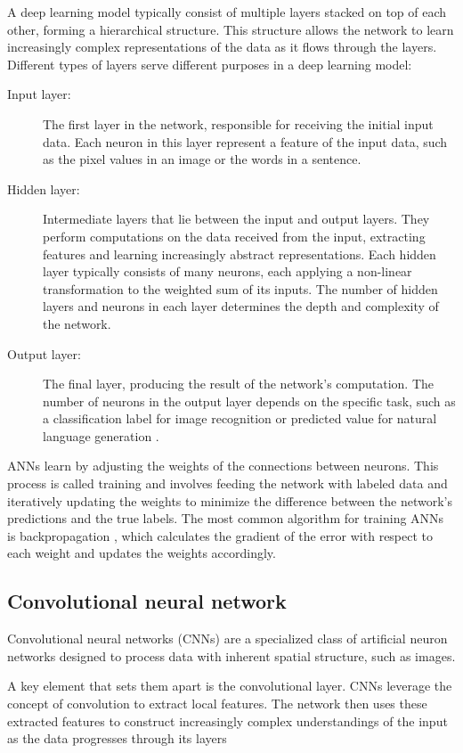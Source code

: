 A deep learning model typically consist of multiple layers stacked on top of each other, forming a hierarchical structure.
This structure allows the network to learn increasingly complex representations of the data as it flows through the layers.
Different types of layers serve different purposes in a deep learning model:
\begin{description}
    \item[Input layer:] 
    The first layer in the network, responsible for receiving the initial input data.
    Each neuron in this layer represent a feature of the input data, such as the pixel values in an image or the words in a sentence.
    \item[Hidden layer:] 
    Intermediate layers that lie between the input and output layers.
    They perform computations on the data received from the input, extracting features and learning increasingly abstract representations.
    Each hidden layer typically consists of many neurons, each applying a non-linear transformation to the weighted sum of its inputs. %
    The number of hidden layers and neurons in each layer determines the depth and complexity of the network.
    \item[Output layer:] 
    The final layer, producing the result of the network's computation.
    The number of neurons in the output layer depends on the specific task, such as a classification label for image recognition or predicted value for natural language generation \cite{}.
\end{description}

ANNs learn by adjusting the weights of the connections between neurons.
This process is called training and involves feeding the network with labeled data and iteratively updating the weights to minimize the difference between the network's predictions and the true labels.
The most common algorithm for training ANNs is backpropagation \cite{}, which calculates the gradient of the error with respect to each weight and updates the weights accordingly.

\subsection{Convolutional neural network}
Convolutional neural networks (CNNs) are a specialized class of artificial neuron networks designed to process data with inherent spatial structure, such as images.

A key element that sets them apart is the convolutional layer.
CNNs leverage the concept of convolution to extract local features.
The network then uses these extracted features to construct increasingly complex understandings of the input as the data progresses through its layers

